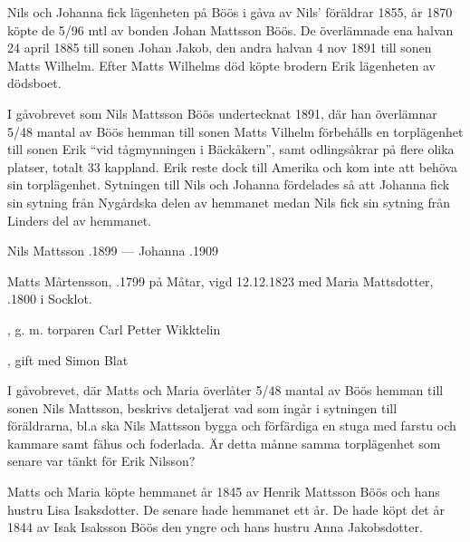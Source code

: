 Nils och Johanna fick lägenheten på Böös i gåva av Nils' föräldrar 1855, år 1870 köpte de 5/96 mtl av bonden Johan Mattsson Böös. De överlämnade ena halvan 24 april 1885 till sonen Johan Jakob, den andra halvan 4 nov 1891 till sonen Matts Wilhelm. Efter Matts Wilhelms död köpte brodern Erik lägenheten av dödsboet.

I gåvobrevet som Nils Mattsson Böös undertecknat 1891, där han överlämnar 5/48 mantal av Böös hemman till sonen Matts Vilhelm förbehålls en torplägenhet till sonen Erik ``vid tågmynningen i Bäckåkern'', samt odlingsåkrar på flere olika platser, totalt 33 kappland. Erik reste dock till Amerika och kom inte att behöva sin torplägenhet. Sytningen till Nils och Johanna fördelades så att Johanna fick sin sytning från Nygårdska delen av hemmanet medan Nils fick sin sytning från Linders del av hemmanet.

Nils Mattsson .1899  ---  Johanna .1909


%
Matts Mårtensson, .1799 på Måtar, vigd 12.12.1823 med  Maria Mattsdotter, .1800 i Socklot.
\begin{jhchildren}
  \item {}
  \item {}
  \item {}, g. m. torparen Carl Petter Wikktelin
  \item {}
  \item {}, gift med Simon Blat
  \item {}
\end{jhchildren}
I gåvobrevet, där Matts och Maria överlåter 5/48 mantal av Böös hemman till sonen Nils Mattsson, beskrivs detaljerat vad som ingår i sytningen till föräldrarna, bl.a ska Nils Mattsson bygga och förfärdiga en stuga med farstu och kammare samt fähus och foderlada. Är detta månne samma torplägenhet som senare var tänkt för Erik Nilsson?

Matts och Maria köpte hemmanet år 1845 av Henrik Mattsson Böös och hans hustru Lisa Isaksdotter. De senare hade hemmanet ett år. De hade köpt det år 1844 av Isak Isaksson Böös den yngre och hans hustru Anna Jakobsdotter.


